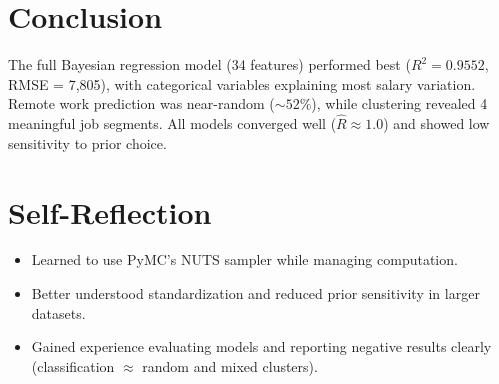 \documentclass[11pt,a4paper]{article}
\begin{document}
\section{Conclusion}

The full Bayesian regression model (34 features) performed best ($R^2 = 0.9552$, RMSE = 7,805), with categorical variables explaining most salary variation. Remote work prediction was near-random ($\sim 52\%$), while clustering revealed 4 meaningful job segments. All models converged well ($\hat{R} \approx 1.0$) and showed low sensitivity to prior choice.

\section{Self-Reflection}
\begin{itemize}
    \item Learned to use PyMC's NUTS sampler while managing computation.
    \item Better understood standardization and reduced prior sensitivity in larger datasets.
    \item Gained experience evaluating models and reporting negative results clearly (classification $\approx$ random and mixed clusters).
\end{itemize}
\end{document}
